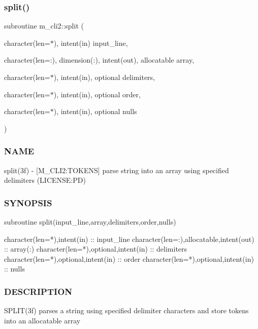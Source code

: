 \subsubsection{\texorpdfstring{split()}{split()}}
{\footnotesize\ttfamily subroutine m\+\_\+cli2\+::split (\begin{DoxyParamCaption}\item[{character(len=$\ast$), intent(in)}]{input\+\_\+line,  }\item[{character(len=\+:), dimension(\+:), intent(out), allocatable}]{array,  }\item[{character(len=$\ast$), intent(in), optional}]{delimiters,  }\item[{character(len=$\ast$), intent(in), optional}]{order,  }\item[{character(len=$\ast$), intent(in), optional}]{nulls }\end{DoxyParamCaption})\hspace{0.3cm}{\ttfamily [private]}}



\subsubsection*{N\+A\+ME}

split(3f) -\/ \mbox{[}M\+\_\+\+C\+L\+I2\+:T\+O\+K\+E\+NS\mbox{]} parse string into an array using specified delimiters (L\+I\+C\+E\+N\+SE\+:PD) 

\subsubsection*{S\+Y\+N\+O\+P\+S\+IS}

\begin{DoxyVerb}subroutine split(input_line,array,delimiters,order,nulls)

 character(len=*),intent(in)              :: input_line
 character(len=:),allocatable,intent(out) :: array(:)
 character(len=*),optional,intent(in)     :: delimiters
 character(len=*),optional,intent(in)     :: order
 character(len=*),optional,intent(in)     :: nulls
\end{DoxyVerb}
 \subsubsection*{D\+E\+S\+C\+R\+I\+P\+T\+I\+ON}

S\+P\+L\+I\+T(3f) parses a string using specified delimiter characters and store tokens into an allocatable array

